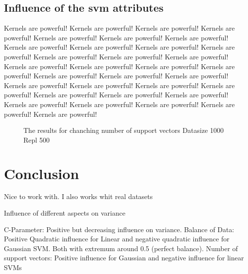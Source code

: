\documentclass[letterpaper]{article}
\begin{document}
\subsection{Influence of the svm attributes}
 Kernels are powerful! Kernels are powerful! Kernels are powerful! Kernels are powerful! Kernels are powerful! Kernels are powerful! Kernels are powerful! Kernels are powerful! Kernels are powerful! Kernels are powerful! Kernels are powerful! Kernels are powerful! Kernels are powerful! Kernels are powerful! Kernels are powerful! Kernels are powerful! Kernels are powerful! Kernels are powerful! Kernels are powerful! Kernels are powerful! Kernels are powerful! Kernels are powerful! Kernels are powerful! Kernels are powerful! Kernels are powerful! Kernels are powerful! Kernels are powerful! Kernels are powerful! Kernels are powerful! Kernels are powerful! Kernels are powerful! Kernels are powerful! Kernels are powerful! 

\begin{figure}[!htb]
\begin{center}

\caption{The results for chanching number of support vectors Datasize 1000 Repl 500}
\label{fig1}
\end{center}
\end{figure}


\section{Conclusion}
Nice to work with. I also works whit real datasets

Influence of different aspects on variance


C-Parameter: Positive but decreasing influence on variance. Balance of Data: Positive Quadratic influence for Linear and negative quadratic influence for Gaussian SVM. Both with extremum around 0.5 (perfect balance).
Number of support vectors: Positive influence for Gaussian and negative influence for linear SVMs
\end{document}
